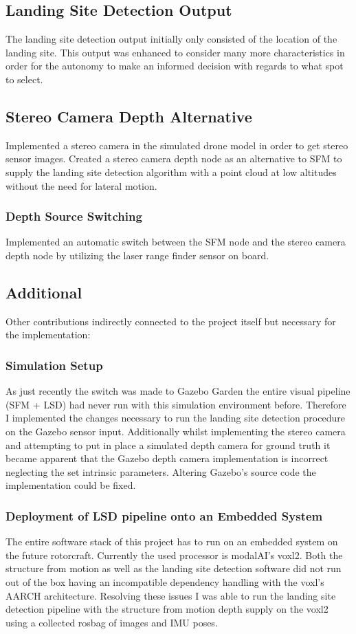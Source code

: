 \subsection{Landing Site Detection Output}
The landing site detection output initially only consisted of the location of the landing site. This output was enhanced to consider many more characteristics in order for the autonomy to make an informed decision with regards to what spot to select.
\subsection{Stereo Camera Depth Alternative}
Implemented a stereo camera in the simulated drone model in order to get stereo sensor images. Created a stereo camera depth node as an alternative to SFM to supply the landing site detection algorithm with a point cloud at low altitudes without the need for lateral motion. 
\subsubsection{Depth Source Switching}
Implemented an automatic switch between the SFM node and the stereo camera depth node by utilizing the laser range finder sensor on board.
\subsection{Additional}
Other contributions indirectly connected to the project itself but necessary for the implementation:
\subsubsection{Simulation Setup}
As just recently the switch was made to Gazebo Garden the entire visual pipeline (SFM + LSD) had never run with this simulation environment before. Therefore I implemented the changes necessary to run the landing site detection procedure on the Gazebo sensor input. Additionally whilst implementing the stereo camera and attempting to put in place a simulated depth camera for ground truth it became apparent that the Gazebo depth camera implementation is incorrect neglecting the set intrinsic parameters. Altering Gazebo's source code the implementation could be fixed.
\subsubsection{Deployment of LSD pipeline onto an Embedded System}\label{subsubsec:voxl2}
The entire software stack of this project has to run on an embedded system on the future rotorcraft. Currently the used processor is modalAI's voxl2. Both the structure from motion as well as the landing site detection software did not run out of the box having an incompatible dependency handling with the voxl's AARCH architecture. Resolving these issues I was able to run the landing site detection pipeline with the structure from motion depth supply on the voxl2 using a collected rosbag of images and IMU poses.

